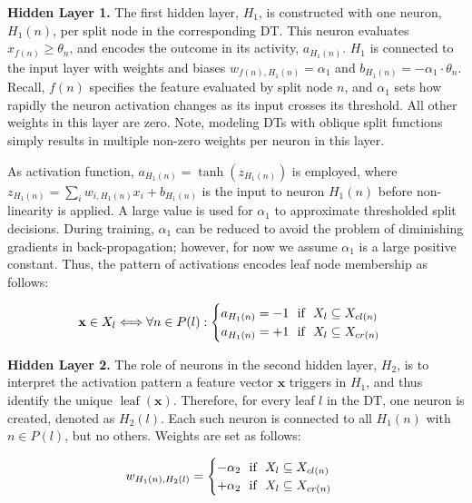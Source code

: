 \documentclass[twocolumn]{svjour3}
\DeclareMathOperator{\leaf}{leaf}
\begin{document}
\textbf{Hidden Layer 1. } 
The first hidden layer, $H_1$, is constructed with one neuron, $H_1(n)$, per split node in the corresponding DT. This neuron evaluates $x_{f(n)} \geq \theta_n$, and encodes the outcome in its activity, $a_{H_1(n)}$. $H_1$ is connected to the input layer with weights and biases $w_{{f(n)},H_1(n)} = \alpha_1$ and $b_{H_1(n)} = -\alpha_1 \cdot \theta_n$.
Recall, $f(n)$ specifies the feature evaluated by split node $n$, and $\alpha_1$ sets how rapidly the neuron activation changes as its input crosses its threshold.
All other weights in this layer are zero.
Note, modeling DTs with oblique split functions simply results in multiple non-zero weights per neuron in this layer.

As activation function, $a_{H_1(n)}=\tanh(z_{H_1(n)})$ is employed, where $z_{H_1(n)} = \sum_{i} w_{i,H_1(n)}x_{i} + b_{H_1(n)}$ is the input to neuron $H_1(n)$ before non-linearity is applied.
A large value is used for $\alpha_1$ to approximate thresholded split decisions.
During training, $\alpha_1$ can be reduced to avoid the problem of diminishing gradients in back-propagation; however, for now we assume $\alpha_1$ is a large positive constant.
Thus, the pattern of activations encodes leaf node membership as follows:
\vspace{-6pt}

{
\small
\begin{equation}
\mathbf{x} \in X_l \Longleftrightarrow \forall n \in P(l) : \begin{cases}
a_{H_1(n)} = -1 \ \ \textnormal{if} \ \ X_l \subseteq X_{cl(n)} \\
a_{H_1(n)} = +1 \ \ \textnormal{if} \ \ X_l \subseteq X_{cr(n)} \\
\end{cases}
\label{eq:nn:leaf-membership}
\end{equation}
}

\textbf{Hidden Layer 2. } The role of neurons in the second hidden layer, $H_2$, is to interpret the activation pattern a feature vector $\mathbf{x}$ triggers in $H_1$,  and thus identify the unique $\leaf(\mathbf{x})$. 
Therefore, for every leaf $l$ in the DT, one neuron is created, denoted as $H_2(l)$. Each such neuron is connected to all $H_1(n)$ with $n \in P(l)$, but no others. Weights are set as follows: 
\vspace{-6pt}

{
\small
\begin{equation}
w_{H_1(n),H_2(l)} = \begin{cases}
-\alpha_2 \ \ \textnormal{if} \ \ X_l \subseteq X_{cl(n)} \\
+\alpha_2 \ \ \textnormal{if} \ \ X_l \subseteq X_{cr(n)} \\
\end{cases}
\end{equation}
}
\end{document}
